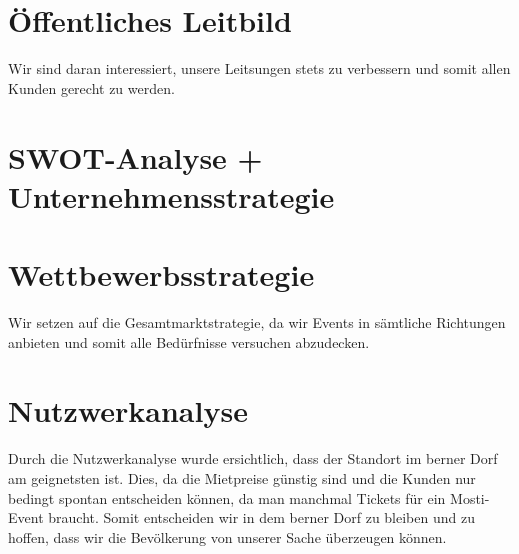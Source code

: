 \documentclass[a4paper, titlepage]{article}
\begin{document}
\section{Öffentliches Leitbild}
Wir sind daran interessiert, unsere Leitsungen stets zu verbessern und somit allen Kunden gerecht zu werden.
\section{SWOT-Analyse + Unternehmensstrategie}


\section{Wettbewerbsstrategie}
Wir setzen auf die Gesamtmarktstrategie, da wir Events in sämtliche Richtungen anbieten und somit alle Bedürfnisse versuchen abzudecken.

\section{Nutzwerkanalyse}
Durch die Nutzwerkanalyse wurde ersichtlich, dass der Standort im berner Dorf am geignetsten ist. 
Dies, da die Mietpreise günstig sind und die Kunden nur bedingt spontan entscheiden können, da man manchmal Tickets für ein Mosti-Event braucht.
Somit entscheiden wir in dem berner Dorf zu bleiben und zu hoffen, dass wir die Bevölkerung von unserer Sache überzeugen können.
\end{document}
